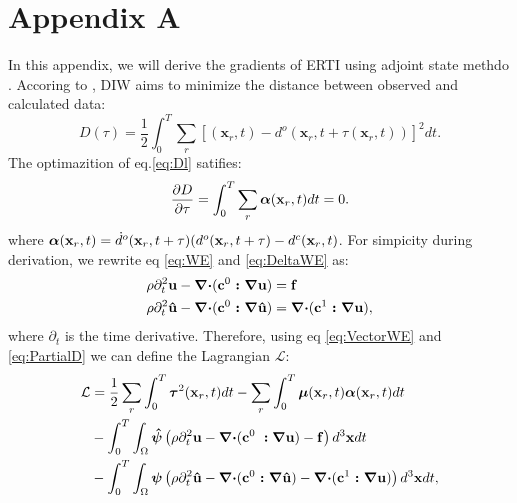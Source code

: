 \section{Appendix A}
In this appendix, we will derive the gradients of ERTI using adjoint
state methdo \cite{plessix2006,Liu2006}. Accoring to \cite{Hale2013}, DIW aims to minimize the
distance between observed and calculated data:
\begin{equation}
	D(\tau)=\frac{1}{2}\int^T_0\sum_r[
	(\mathbf{x}_r,t)-
	d^o(\mathbf{x}_r,t+\tau(\mathbf{x}_r,t))]^2dt.
        \label{eq:Dl}
\end{equation}
The optimazition of eq.\eqref{eq:Dl} satifies:
\begin{equation}
	\frac{\partial D}{\partial \tau}=\int^T_0\sum_r
	\boldsymbol{{}\alpha}(\mathbf{x}_r,t)dt=0.
        \label{eq:PartialD}
\end{equation}
where $\boldsymbol{{}\alpha}(\mathbf{x}_r,t)=\dot{d}^o(\mathbf{x}_r,t+\tau)(d^o(\mathbf{x}_r,t+\tau)-
d^c(\mathbf{x}_r,t)$.
For simpicity during derivation, we rewrite eq \eqref{eq:WE} and \eqref{eq:DeltaWE} as:
\begin{equation}
	\begin{split}
	&\rho\partial^2_t \mathbf{u} -\boldsymbol{{}\nabla\cdot}
	(\boldsymbol{{}\mathbf{c}}^0\boldsymbol{{}:\nabla\mathbf{u}}) = \mathbf{f}\\
	&\rho\partial^2_t
	\mathbf{\hat{u}}-\boldsymbol{{}\nabla\cdot}(\boldsymbol{{}\mathbf{c}}^0\boldsymbol{{}:\nabla\mathbf{\hat{u}}})=
	\boldsymbol{{}\nabla\cdot}(\mathbf{c}^1\boldsymbol{{}:\nabla\mathbf{u}}),
	\end{split}
        \label{eq:VectorWE}
\end{equation}
where $\partial_t$ is the time derivative.
Therefore, 
using eq \eqref{eq:VectorWE} and \eqref{eq:PartialD}
we can define the Lagrangian $\mathcal{L}$: 
\begin{equation}
	\begin{split}
		\mathcal{L}
		&=\frac{1}{2}\sum_{r}\int^T_0\boldsymbol{{}\tau}^2(\mathbf{x}_r,t)dt -\sum_{r}\int^T_0
		\boldsymbol{{}\mu}(\mathbf{x}_r,t)\boldsymbol{{}\alpha}(\mathbf{x}_r,t)dt\\
	&-\int^T_0\int_{\Omega} \boldsymbol{{}\hat \psi}\left(\rho\partial^2_t \mathbf{u} -\boldsymbol{{}\nabla
	\cdot}
	(\boldsymbol{{}\mathbf{c}}^0\boldsymbol{{}:}\boldsymbol{{}\nabla\mathbf{u}}) - \mathbf{f}\right)d^3\mathbf{x}dt\\
	&-\int^T_0\int_{\Omega} \boldsymbol{{}\psi}\left(\rho\partial^2_t
	\mathbf{\hat{u}}-\boldsymbol{{}\nabla\cdot}(\boldsymbol{{}\mathbf{c}}^0\boldsymbol{{}:\nabla\mathbf{\hat{u}}})-
	\boldsymbol{{}\nabla\cdot}(\mathbf{c}^1\boldsymbol{{}:\nabla\mathbf{u}})\right)d^3\mathbf{x}dt,
	\end{split}
        \label{eq:Lagrangian}
\end{equation}
